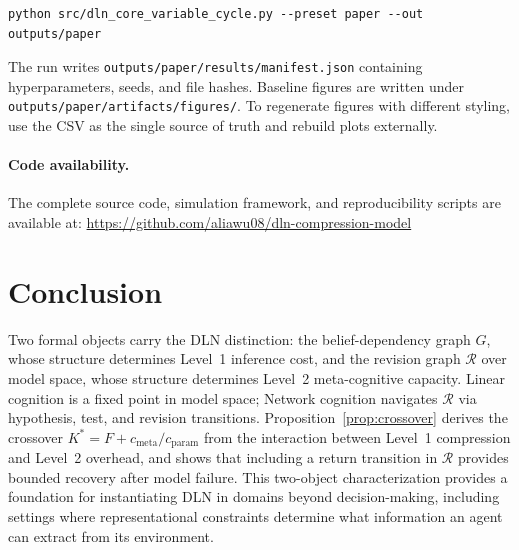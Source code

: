 \documentclass[11pt]{article}
\begin{document}
\begin{verbatim}
python src/dln_core_variable_cycle.py --preset paper --out outputs/paper
\end{verbatim}

The run writes \texttt{outputs/paper/results/manifest.json} containing hyperparameters, seeds, and file hashes. Baseline figures are written under \texttt{outputs/paper/artifacts/figures/}. To regenerate figures with different styling, use the CSV as the single source of truth and rebuild plots externally.

\paragraph{Code availability.}
The complete source code, simulation framework, and reproducibility scripts are available at:
\url{https://github.com/aliawu08/dln-compression-model}


\section{Conclusion}

Two formal objects carry the DLN distinction: the belief-dependency graph $G$,
whose structure determines Level~1 inference cost, and the revision graph
$\mathcal{R}$ over model space, whose structure determines Level~2 meta-cognitive
capacity.  Linear cognition is a fixed point in model space; Network cognition
navigates $\mathcal{R}$ via hypothesis, test, and revision transitions.
Proposition~\ref{prop:crossover} derives the crossover
$K^* = F + c_{\mathrm{meta}}/c_{\mathrm{param}}$ from the interaction between
Level~1 compression and Level~2 overhead, and shows that including a return
transition in $\mathcal{R}$ provides bounded recovery after model failure.
This two-object characterization provides a foundation for instantiating DLN in
domains beyond decision-making, including settings where representational
constraints determine what information an agent can extract from its
environment.
\end{document}
